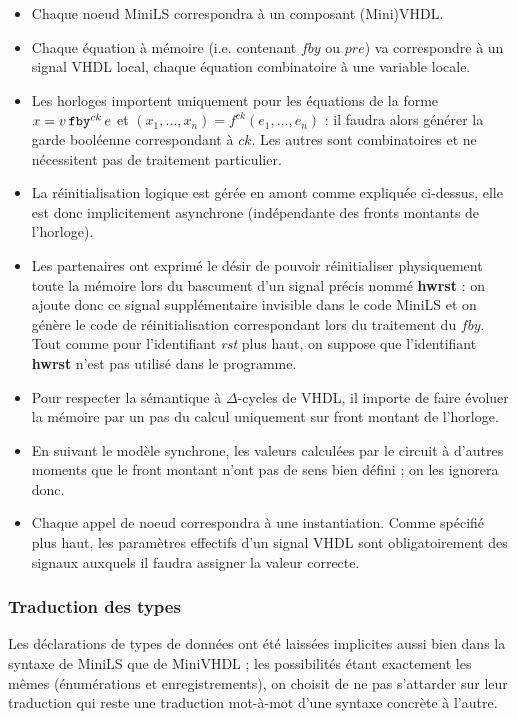 \documentclass[a4paper]{article}
\newcommand{\mybox}[1]{\mbox{\tt{#1}}}
\newcommand{\Fby}[2]{#1 \, \mybox{fby}^{ck} \, #2}
\newcommand{\App}[2]{#1^{ck}(#2)}
\begin{document}
\begin{itemize}
\item Chaque noeud MiniLS correspondra \`a un composant (Mini)VHDL.
\item Chaque \'equation \`a m\'emoire (i.e. contenant $fby$ ou $pre$) va correspondre
  \`a un signal VHDL local, chaque \'equation combinatoire \`a une variable locale.
\item Les horloges importent uniquement pour les équations de la forme $x =
  \Fby{v}{e}$ et $(x_1,\dots,x_n) = \App{f}{e_1,\dots,e_n}$ : il faudra alors
  générer la garde booléenne correspondant à $ck$. Les autres sont combinatoires
  et ne nécessitent pas de traitement particulier.
\item La r\'einitialisation logique est g\'er\'ee en amont comme expliqu\'ee ci-dessus,
  elle est donc implicitement asynchrone (ind\'ependante des fronts montants de
  l'horloge).
\item Les partenaires ont exprim\'e le d\'esir de pouvoir r\'einitialiser
  physiquement toute la m\'emoire lors du bascument d'un signal pr\'ecis nomm\'e
  \textbf{hwrst} : on ajoute donc ce signal suppl\'ementaire invisible dans le
  code MiniLS et on g\'en\`ere le code de r\'einitialisation correspondant lors
  du traitement du $fby$. Tout comme pour l'identifiant \textit{rst} plus haut, on suppose que l'identifiant \textbf{hwrst} n'est pas utilisé dans le programme.
\item Pour respecter la s\'emantique \`a $\Delta$-cycles de VHDL, il importe de
  faire \'evoluer la m\'emoire par un pas du calcul uniquement sur front montant de
  l'horloge.
\item En suivant le mod\`ele synchrone, les valeurs calcul\'ees par le circuit \`a
  d'autres moments que le front montant n'ont pas de sens bien d\'efini ; on les
  ignorera donc.
\item Chaque appel de noeud correspondra \`a une instantiation. Comme sp\'ecifi\'e
  plus haut, les param\`etres effectifs d'un signal VHDL sont obligatoirement des
  signaux auxquels il faudra assigner la valeur correcte.
\end{itemize}

\subsubsection{Traduction des types}

Les d\'eclarations de types de donn\'ees ont \'et\'e laiss\'ees implicites aussi bien dans
la syntaxe de MiniLS que de MiniVHDL ; les possibilit\'es \'etant exactement les
m\^emes (\'enum\'erations et enregistrements), on choisit de ne pas s'attarder sur
leur traduction qui reste une traduction mot-\`a-mot d'une syntaxe concr\`ete \`a
l'autre.
\end{document}
